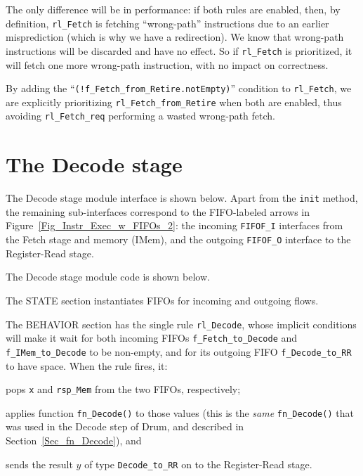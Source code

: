 The only difference will be in performance: if both rules are enabled,
then, by definition, \verb|rl_Fetch| is fetching ``wrong-path''
instructions due to an earlier misprediction (which is why we have a
redirection).  We know that wrong-path instructions will be discarded
and have no effect.  So if \verb|rl_Fetch| is prioritized, it will
fetch one more wrong-path instruction, with no impact on correctness.

By adding the ``\verb|(!f_Fetch_from_Retire.notEmpty)|'' condition to
\verb|rl_Fetch|, we are explicitly prioritizing
\verb|rl_Fetch_from_Retire| when both are enabled, thus avoiding
\verb|rl_Fetch_req| performing a wasted wrong-path fetch.


\section{The Decode stage}

\label{Sec_Fife_Decode_stage}

The Decode stage module interface is shown below.  Apart from the
\verb|init| method, the remaining sub-interfaces correspond to the
FIFO-labeled arrows in Figure~\ref{Fig_Instr_Exec_w_FIFOs_2}: the
incoming \verb|FIFOF_I| interfaces from the Fetch stage and memory
(IMem), and the outgoing \verb|FIFOF_O| interface to the Register-Read
stage.



The Decode stage module code is shown below.



The STATE section instantiates FIFOs for incoming and outgoing flows.

The BEHAVIOR section has the single rule \verb|rl_Decode|, whose
implicit conditions will make it wait for both incoming FIFOs
\verb|f_Fetch_to_Decode| and \verb|f_IMem_to_Decode| to be non-empty,
and for its outgoing FIFO \verb|f_Decode_to_RR| to have space.  When
the rule fires, it:

\begin{tightlist}
 \item pops \verb|x| and \verb|rsp_Mem| from the two FIFOs, respectively;

 \item applies function \verb|fn_Decode()| to those values (this is
       the \emph{same} \verb|fn_Decode()| that was used in the Decode
       step of Drum, and described in Section~\ref{Sec_fn_Decode}),
       and

 \item sends the result $y$ of type \verb|Decode_to_RR| on to the
       Register-Read stage.
\end{tightlist}

